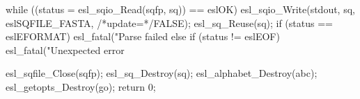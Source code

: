 \begin{cchunk}
{  while ((status = esl_sqio_Read(sqfp, sq)) == eslOK)
    {  
      esl_sqio_Write(stdout, sq, eslSQFILE_FASTA, /*update=*/FALSE);
      esl_sq_Reuse(sq);
    }
  if      (status == eslEFORMAT) esl_fatal("Parse failed\n  %
  else if (status != eslEOF)     esl_fatal("Unexpected error %
  
  esl_sqfile_Close(sqfp);
  esl_sq_Destroy(sq);
  esl_alphabet_Destroy(abc);
  esl_getopts_Destroy(go);
  return 0;
}
\end{cchunk}
